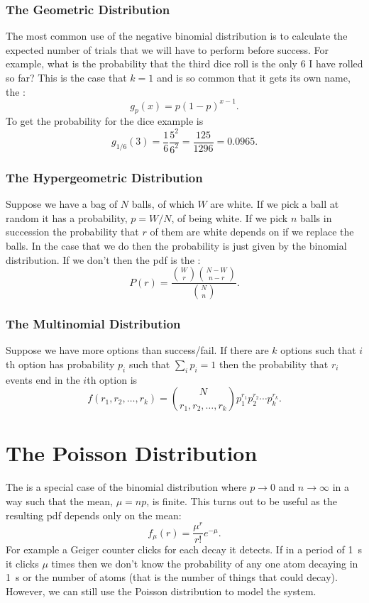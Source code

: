 \documentclass[a4paper]{article}
\begin{document}
    \subsubsection{The Geometric Distribution}
    The most common use of the negative binomial distribution is to calculate the expected number of trials that we will have to perform before success.
    For example, what is the probability that the third dice roll is the only 6 I have rolled so far?
    This is the case that \(k = 1\) and is so common that it gets its own name, the :
    \[g_p(x) = p(1-p)^{x-1}.\]
    To get the probability for the dice example is 
    \[g_{1/6}(3) = \frac{1}{6}\frac{5^2}{6^2} = \frac{125}{1296} = 0.0965.\]
    
    \subsubsection{The Hypergeometric Distribution}
    Suppose we have a bag of \(N\) balls, of which \(W\) are white.
    If we pick a ball at random it has a probability, \(p = W/N\), of being white.
    If we pick \(n\) balls in succession the probability that \(r\) of them are white depends on if we replace the balls.
    In the case that we do then the probability is just given by the binomial distribution.
    If we don't then the \gls{pdf} is the :
    \[P(r) = \frac{{W\choose r}{N-W\choose n-r}}{{N\choose n}}.\]
    
    \subsubsection{The Multinomial Distribution}
    Suppose we have more options than success/fail.
    If there are \(k\) options such that \(i\)th option has probability \(p_i\) such that \(\sum_i p_i = 1\) then the probability that \(r_i\) events end in the \(i\)th option is
    \[f(r_1, r_2, \dotsc, r_k) = {N \choose r_1, r_2, \dotsc, r_k}p_1^{r_1}p_2^{r_2}\dotsm p_k^{r_k}.\]
    \section{The Poisson Distribution}
    The  is a special case of the binomial distribution where \(p\to 0\) and \(n\to\infty\) in a way such that the mean, \(\mu = np\), is finite.
    This turns out to be useful as the resulting \gls{pdf} depends only on the mean:
    \[f_\mu(r) = \frac{\mu^r}{r!}e^{-\mu}.\]
    For example a Geiger counter clicks for each decay it detects.
    If in a period of \SI{1}{\second} it clicks \(\mu\) times then we don't know the probability of any one atom decaying in \SI{1}{\second} or the number of atoms (that is the number of things that could decay).
    However, we can still use the Poisson distribution to model the system.
    
\end{document}
